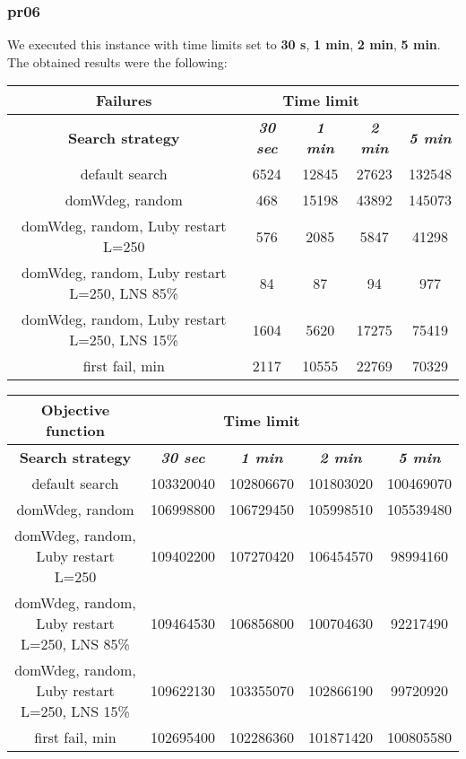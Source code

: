 \subsubsection{pr06}
We executed this instance with time limits set to \textbf{30 s}, \textbf{1 min}, \textbf{2 min}, \textbf{5 min}.\\
The obtained results were the following:
{
\renewcommand{\arraystretch}{2}
\begin{longtable}[h]{| c | c | c | c | c |}
    \hline
    \textbf{Failures} & \multicolumn{3}{c}{Time limit} & \\
    \hline
    \textbf{Search strategy} & \textbf{\textit{30 sec}} & \textbf{\textit{1 min}} & \textbf{\textit{2 min}} & \textbf{\textit{5 min}} \\
    \hline
    \endhead
    default search                                & 6524 & 12845 &  27623 & 132548 \\
    \hline
    domWdeg, random                               &  468 & 15198 &  43892 & 145073 \\
    \hline
    domWdeg, random, Luby restart L=250           &  576 &  2085 &   5847 &  41298 \\
    \hline
    domWdeg, random, Luby restart L=250, LNS 85\% &   84 &    87 &     94 &    977 \\
    \hline
    domWdeg, random, Luby restart L=250, LNS 15\% & 1604 &  5620 &  17275 &  75419 \\
    \hline
    first fail, min                               & 2117 & 10555 &  22769 &  70329 \\
    \hline
\end{longtable}
}

{
\renewcommand{\arraystretch}{2}
\begin{longtable}[h]{| c | c | c | c | c |}
    \hline
    \textbf{Objective function} & \multicolumn{3}{c}{Time limit} & \\
    \hline
    \textbf{Search strategy} & \textbf{\textit{30 sec}} & \textbf{\textit{1 min}} & \textbf{\textit{2 min}} & \textbf{\textit{5 min}} \\
    \hline
    \endhead
    default search                                & 103320040 & 102806670 & 101803020 & 100469070 \\
    \hline
    domWdeg, random                               & 106998800 & 106729450 & 105998510 & 105539480 \\
    \hline
    domWdeg, random, Luby restart L=250           & 109402200 & 107270420 & 106454570 &  98994160 \\
    \hline
    domWdeg, random, Luby restart L=250, LNS 85\% & 109464530 & 106856800 & 100704630 &  92217490 \\
    \hline
    domWdeg, random, Luby restart L=250, LNS 15\% & 109622130 & 103355070 & 102866190 &  99720920 \\
    \hline
    first fail, min                               & 102695400 & 102286360 & 101871420 & 100805580 \\
    \hline
\end{longtable}
}